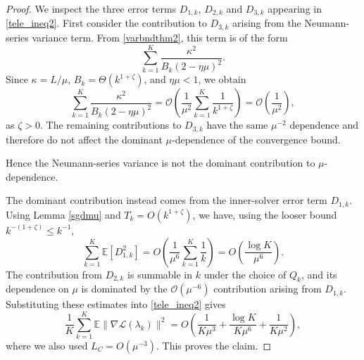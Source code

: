 \documentclass[11pt, twoside]{report}
\begin{document}
\begin{proof}
We inspect the three error terms $D_{1,k}$, $D_{2,k}$ and $D_{3,k}$ appearing in
\eqref{tele_ineq2}. First consider the contribution to $D_{3,k}$ arising from the Neumann-series variance term. From \eqref{varbndthm2}, this term is of the form
\[
\sum_{k=1}^{K}
\frac{\kappa^2}{B_k(2-\eta\mu)^2}.
\]
Since \(\kappa=L/\mu\), \(B_k=\Theta(k^{1+\zeta})\), and \(\eta\mu<1\), we obtain
\[
\sum_{k=1}^{K}\frac{\kappa^2}{B_k(2-\eta\mu)^2}
=
\mathcal O\left(
\frac{1}{\mu^2}\sum_{k=1}^{K}\frac{1}{k^{1+\zeta}}
\right)
=
\mathcal O\left(\frac{1}{\mu^2}\right),
\]
as \(\zeta>0\). The remaining contributions to $D_{3,k}$ have the same $\mu^{-2}$ dependence and therefore do not affect the dominant $\mu$-dependence of the convergence bound.

Hence the Neumann-series variance is not the dominant contribution to
$\mu$-dependence. 

The dominant contribution instead comes from the inner-solver error term
$D_{1,k}$. Using Lemma \ref{sgdmu} and $T_k=O(k^{1+\zeta})$, we have, using the
looser bound $k^{-(1+\zeta)}\leq k^{-1}$,
\[
\sum_{k=1}^{K}\mathbb{E}[D_{1,k}^2]
=
O\left(
\frac{1}{\mu^6}
\sum_{k=1}^{K}\frac{1}{k}
\right)
=
O\left(\frac{\log K}{\mu^6}\right).
\]
The contribution from \(D_{2,k}\) is summable in \(k\) under the choice of \(Q_k\), and its dependence on \(\mu\) is dominated by the \(\mathcal O(\mu^{-6})\) contribution arising from \(D_{1,k}\). Substituting these estimates into \eqref{tele_ineq2}
gives
\[
\frac{1}{K}\sum_{k=1}^{K}\mathbb{E}\|\nabla \mathcal L(\lambda_k)\|^2
=
O\left(
\frac{1}{K\mu^3}
+
\frac{\log K}{K\mu^6}
+
\frac{1}{K\mu^2}
\right),
\]
where we also used $L_C=O(\mu^{-3})$. This proves the claim.
\end{proof}
\end{document}
